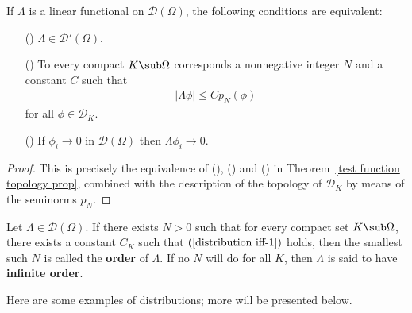 \begin{proposition}\label{distribution iff}
If $\Lambda$ is a linear functional on $\mathscr{D}(\Omega)$, the following conditions are equivalent:
\begin{itemize}
\item[(\rmnum{1})] $\Lambda\in\mathscr{D}'(\Omega)$.
\item[(\rmnum{2})] To every compact $K\sub\Omega$ corresponds a nonnegative integer $N$ and a constant $C$ such that
\begin{align}\label{distribution iff-1}
|\Lambda\phi|\leq Cp_N(\phi)
\end{align}
for all $\phi\in\mathscr{D}_K$.
\item[(\rmnum{3})] If $\phi_i\to 0$ in $\mathscr{D}(\Omega)$ then $\Lambda\phi_i\to 0$.
\end{itemize}
\end{proposition}
\begin{proof}
This is precisely the equivalence of (), () and () in Theorem~\ref{test function topology prop}, combined with the description of the topology of $\mathscr{D}_K$ by means of the seminorms $p_N$.
\end{proof}
Let $\Lambda\in\mathscr{D}(\Omega)$. If there exists $N>0$ such that for every compact set $K\sub\Omega$, there exists a constant $C_K$ such that $(\ref{distribution iff-1})$ holds, then the smallest such $N$ is called the \textbf{order} of $\Lambda$. If no $N$ will do for all $K$, then $\Lambda$ is said to have \textbf{infinite order}.\par
Here are some examples of distributions; more will be presented below.
